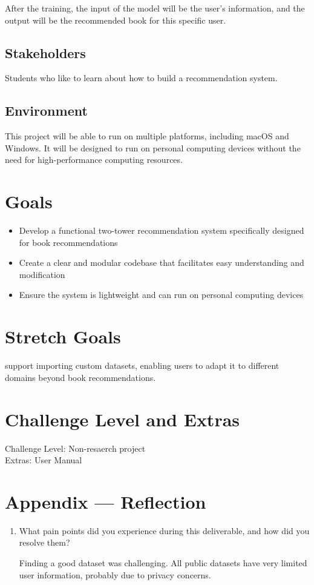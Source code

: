\documentclass{article}
\begin{document}
After the training, the input of the model will be the user's information, and the output will be the recommended book for this specific user.

\subsection{Stakeholders}

Students who like to learn about how to build a recommendation system.

\subsection{Environment}
This project will be able to run on multiple platforms, including macOS and Windows. It will be designed to run on personal computing devices without the need for high-performance computing resources.

\section{Goals}
\begin{itemize}
    \item Develop a functional two-tower recommendation system specifically designed for book recommendations
    \item Create a clear and modular codebase that facilitates easy understanding and modification
    \item Ensure the system is lightweight and can run on personal computing devices
\end{itemize}

\section{Stretch Goals}
support importing custom datasets, enabling users to adapt it to different domains beyond book recommendations.
\section{Challenge Level and Extras}
Challenge Level: Non-resaerch project \\
Extras: User Manual


\newpage{}

\section*{Appendix --- Reflection}

\begin{enumerate}
    \item What pain points did you experience during this deliverable, and how did you resolve them?
    
        Finding a good dataset was challenging. All public datasets have very limited user information, probably due to privacy concerns.

\end{enumerate}  
\end{document}
